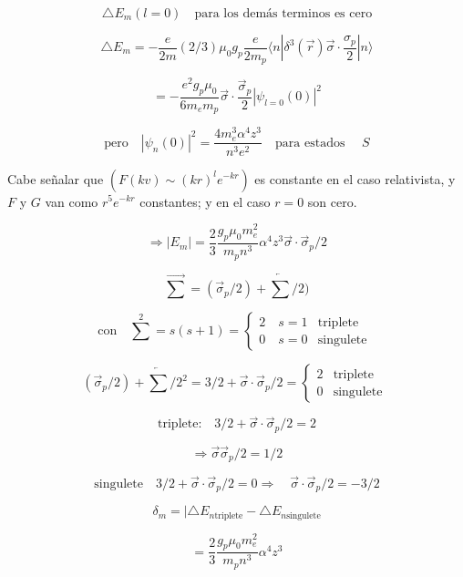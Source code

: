 \documentclass{report}
\begin{document}
\[\bigtriangleup E_m (l = 0) \quad \text{para los demás terminos es cero}\]

\[\bigtriangleup E_{m} = - \frac{e}{2m} (2/3) \mu_{0} g_{p} \frac{e}{2m_{p} } \langle n | \delta^{3} (\overrightarrow{r}) \overrightarrow{\sigma } \cdot \frac{\sigma_{p}}{2} | n \rangle \]

\[= - \frac{e^2 g_p \mu_0 }{6 m_e m_p } \overrightarrow{\sigma } \cdot \frac{\overrightarrow{\sigma} _p }{2} |\psi _{l=0} (0)|^2 \]

\[\text{pero} \quad |\psi_n (0)|^2 = \frac{4 m_{e}^{3} \alpha^4 z^3 }{n^3 e^2 } \quad \text{para estados } \quad S\]

Cabe señalar que $(F(kv) \sim (kr)^l e ^{-kr})$ es constante en el caso relativista, y $F$ y $G$ van como $r^5 e^{-kr}$ constantes; y en el caso $r=0$ son cero.

\[\Rightarrow |E_{m}| = \frac{2}{3} \frac{g_p \mu_0 m_{e}^{2} }{m_p n^3 } \alpha^4 z^3 \overrightarrow{\sigma} \cdot \overrightarrow{\sigma}_p /2\]

\[\overrightarrow{\sum } = (\overrightarrow{ \sigma} _{p}/2)+ \overleftarrow{\sum}/2)\]

\[\text{con} \quad \sum ^2 = s (s+1)  = \begin{cases} 2\quad s=1 &\mbox{triplete } \\

0 \quad s=0 & \mbox{singulete } \end{cases} \]

\[(\overrightarrow{\sigma}_{p}/2)+ \overleftarrow{\sum}/2^{2} = 3/2 + \overrightarrow{\sigma } \cdot \overrightarrow{\sigma}_{p}/2 =\begin{cases} 2 &\mbox{triplete } \\

0  & \mbox{singulete } \end{cases} \]

\[\text{triplete:} \quad 3/2 + \overrightarrow{\sigma} \cdot \overrightarrow{ \sigma }_p /2 = 2 \]

\[\Rightarrow \overrightarrow{\sigma } \overrightarrow{\sigma }_p / 2 = 1/2\]

\[\text{singulete} \quad 3/2 + \overrightarrow{\sigma } \cdot \overrightarrow{\sigma}_p /2 = 0 \Rightarrow \quad \overrightarrow{\sigma} \cdot \overrightarrow{\sigma}_p /2 = - 3/2\]

\[\delta _m =  |\bigtriangleup E_{n \text{triplete}} - \bigtriangleup E_{n \text{singulete}}\]

\[=\frac{2}{3}\frac{g_{p}\mu_{0} m_{e}^{2}}{m_{p} n^{3}} \alpha ^4 z^3\]
\end{document}
